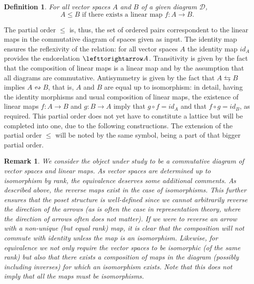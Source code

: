 \documentclass[10pt]{amsart}
\newtheorem{definition}[theorem]{Definition}
\newtheorem{remark}[theorem]{Remark}
\def \DD{{\mathcal D}}
\begin{document}
\begin{definition}
For all vector spaces $A$ and $B$ of a given diagram $\DD$,
\[
A\leq B\text{  if there exists a linear map  }f:A\rightarrow B.
\]
\end{definition}
%
The partial order $\leq $ is, thus, the set of ordered pairs correspondent to the linear maps in the commutative diagram of spaces given as input.
The identity map ensures the reflexivity of the relation: for all vector spaces $A$ the identity map $id_A$ provides the endorelation $\lefttorightarrow A$.
Transitivity is given by the fact that the composition of linear maps is a linear map and by the assumption that all diagrams are commutative. 
Antisymmetry is given by the fact that $A\leftrightarrows B$ implies $A\leftrightsquigarrow B$, that is, $A$ and $B$ are equal up to isomorphism: 
in detail, having the identity morphisms and usual composition of linear maps, the existence of linear maps $f:A\rightarrow B$ and $g:B\rightarrow A$ imply that $g\circ f=id_{A}$ and that $f\circ g=id_{B}$, as required.
%
This partial order does not yet have to constitute a lattice but will be completed into one, due to the following constructions. 
The extension of the partial order $\leq$ will be noted by the same symbol, being a part of that bigger partial order.

\begin{remark}
We consider the object under study to be a commutative diagram of vector spaces and linear maps. As vector spaces are determined up to isomorphism by rank, the equivalence deserves some additional comments. As described above, the reverse maps exist in the case of isomorphisms. This further ensures that the poset structure is well-defined since we cannot arbitrarily reverse the direction of the arrows (as is often the case in representation theory, where the direction of arrows often does not matter). 
If we were to reverse an arrow with a non-unique (but equal rank) map, it is clear that the composition will not commute with identity unless the map is an isomorphism. 
Likewise,  for equivalence we not only require the vector spaces to be isomorphic (of the same rank) but also that there exists a composition of maps in the diagram (possibly including inverses) for which an isomorphism exists. 
Note that this does not imply that all the maps must be isomorphisms. 
\end{remark}
\end{document}
